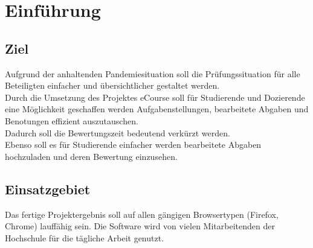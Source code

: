 
\chapter{Einführung}

\section{Ziel}
Aufgrund der anhaltenden Pandemiesituation soll die Prüfungssituation für alle Beteiligten einfacher und übersichtlicher gestaltet werden. \\
Durch die Umsetzung des Projektes eCourse soll für Studierende und Dozierende eine Möglichkeit geschaffen werden Aufgabenstellungen, bearbeitete Abgaben und Benotungen effizient auszutauschen. \\
Dadurch soll die Bewertungszeit bedeutend verkürzt werden. \\
Ebenso soll es für Studierende einfacher werden bearbeitete Abgaben hochzuladen und deren Bewertung einzusehen. \\

\section{Einsatzgebiet}
Das fertige Projektergebnis soll auf allen gängigen Browsertypen (Firefox, Chrome) lauffähig sein. Die Software wird von vielen Mitarbeitenden der Hochschule für die tägliche Arbeit genutzt. \\


